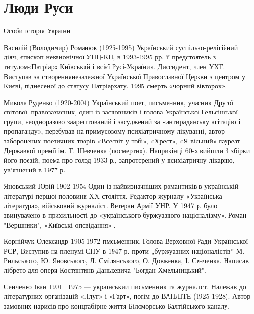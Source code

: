  
 
 

\chapter{Люди Руси}
\label{sec:people}


Особи історія України

Василій (Володимир) Романюк (1925-1995) Український суспільно-релігійний діяч, єпископ неканонічної УПЦ-КП, в 1993-1995 рр. її предстоятель з титулом«Патріарх Київський і всієї Русі-України». Диссидент, член УХГ. Виступав за створеннянезалежної Української Православної Церкви з центром у Києві, піднесеної до статусу Патріархату. 1995 смерть «чорний вівторок».

Микола Руденко (1920-2004) Український поет, письменник, учасник Другої світової, правозахисник, один із засновників і голова Української Гельсінської групи, неодноразово заарештований і засуджений за «антирадянську агітацію і пропаганду», перебував на примусовому психіатричному лікуванні, автор заборонених поетичних творів «Всесвіт у тобі», «Хрест», «Я вільний».лауреат Державної премії ім. Т. Шевченка (посмертно). Наприкінці 60-х вийшли 3 збірки його поезій, поема про голод 1933 р., запроторений у психіатричну лікарню, ув’язнений в 1977 р.

Яновський Юрій 1902-1954 Один із найвизначніших романтиків в українській літературі першої половини XX століття. Редактор журналу «Українська література», військовий журналіст. Ветеран Армії УНР. У 1947 р. було звинувачено в прихильності до «українського буржуазного націоналізму». Роман "Вершники", «Київські оповідання» .

Корнійчук Олександр 1905-1972 пмсьменник, Голова Верховної Ради Української РСР, Виступив на пленумі СПУ в 1947 р. проти „буржуазних націоналістів” М. Рильського, Ю. Яновського, Л. Смілянського, О. Довженка, І. Сенченка. Написав лібрето для опери Костянтинв Данькевича "Богдан Хмельницький".

Сенченко Іван 1901=1975 --- український письменник та журналіст. Належав до літературних організацій «Плуг» і «Гарт», потім до ВАПЛІТЕ (1925-1928). Автор замовних нарисів про концтабірне життя Біломорсько-Балтійського каналу.

